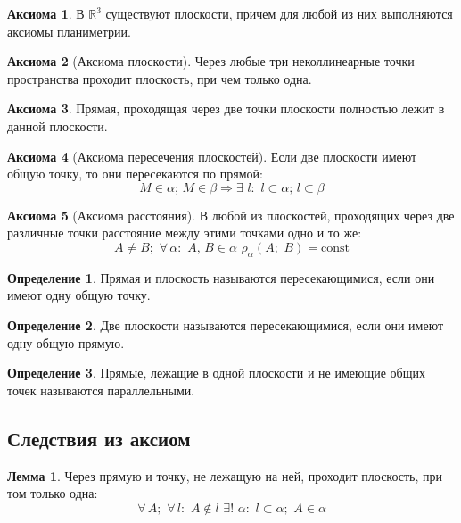 \documentclass[12pt]{article}
\theoremstyle{definition}
\newtheorem{lemma}[theorem]{Лемма}
\newtheorem{definition}{Определение}
\newtheorem{axiom}{Аксиома}
\newcommand{\R}{\mathbb{R}}
\begin{document}
    \begin{axiom}
        В $\R^3$ существуют плоскости, причем для любой из них выполняются аксиомы планиметрии.
    \end{axiom}
    \begin{axiom}[Аксиома плоскости]
        Через любые три неколлинеарные точки пространства проходит плоскость, при чем только одна.
    \end{axiom}
    \begin{axiom}
        Прямая, проходящая через две точки плоскости полностью лежит в данной плоскости.
    \end{axiom}
    \begin{axiom}[Аксиома пересечения плоскостей]
        Если две плоскости имеют общую точку, то они пересекаются по прямой:
        $$M \in \alpha;\,M \in \beta \Longrightarrow \exists\,\,l:\,\,l\subset \alpha;\,l\subset \beta$$
    \end{axiom}
    \begin{axiom}[Аксиома расстояния]
        В любой из плоскостей, проходящих через две различные точки расстояние между этими точками одно и то же:
        $$A \neq B;\,\,\forall\,\alpha:\,\,A,\,B\in\alpha\,\,\rho_\alpha(A;\,\,B)=\text{const}$$
    \end{axiom}
    \begin{definition}
        Прямая и плоскость называются пересекающимися, если они имеют одну общую точку.
    \end{definition}
    \begin{definition}
        Две плоскости называются пересекающимися, если они имеют одну общую прямую.
    \end{definition}
    \begin{definition}
        Прямые, лежащие в одной плоскости и не имеющие общих точек называются параллельными.
    \end{definition}
    
    \subsection{Следствия из аксиом}
    
    \begin{lemma}
        Через прямую и точку, не лежащую на ней, проходит плоскость, при том только одна:
        $$\forall\,A;\,\,\forall\,l:\,\,A\notin l\,\,\exists!\,\,\alpha:\,\,l\subset\alpha;\,\,A\in\alpha$$
    \end{lemma}
    
\end{document}
